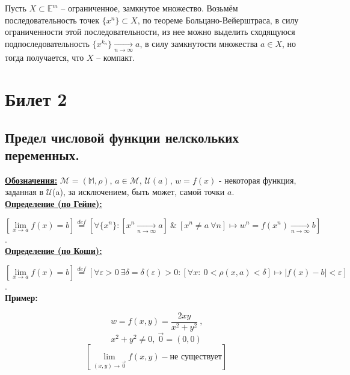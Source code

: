 \documentclass[a4paper,12pt]{article} %
\begin{document}
Пусть $X \subset \mathbb{E}^m$ -- ограниченное, замкнутое множество. Возьмём последовательность точек $\{x^n \} \subset X$, по теореме Больцано-Вейерштраса, в силу ограниченности этой последовательности, из нее можно выделить сходящуюся подпоследовательность $\{x^{k_n} \} \xrightarrow[n \to \infty]{} a$, в силу замкнутости множества $a \in X$, но тогда получается, что $X$ -- компакт.




\newpage
\section{Билет 2}

\subsection{Предел числовой функции нелскольких переменных.}

\underline{\textbf{Обозначения:}}
$\mathscr{M} = (\mathbb{M}, \rho)$, $a \in \mathscr{M}$, $\mathscr{U}(a)$,
$w = f(x)$ - некоторая функция, заданная в $\mathscr{U}$(a), за исключением, быть может, самой точки $a$.\\

\underline{\textbf{Определение (по Гейне):}}

	$[\lim\limits_{x \to a}f(x) = b] \stackrel{def}{=} \left[ \forall \{x^n\}: 
	[x^n \xrightarrow[n \rightarrow \infty]{} a] ~ \& ~ [x^n \neq a ~ \forall n] \mapsto 
	w^n = f(x^n) \xrightarrow[n \rightarrow \infty]{} b\right]$. \\
	
\underline{\textbf{Определение (по Коши):}}

	$[\lim\limits_{x \to a}f(x) = b] \stackrel{def}{=} \left[\forall \varepsilon > 0 ~ 
	\exists\delta = \delta(\varepsilon) > 0: 
	[\forall x: ~ 0 < \rho (x, a) < \delta] \mapsto |f(x) - b| < \varepsilon\right]$. \\

\textbf{Пример:}
	
	$$w = f(x, y) = \frac{2xy}{x^2 + y^2} ~ \text{,}$$
	$$x^2 + y^2 \neq 0, ~ \vec{0} = (0, 0)$$
	$$[\lim\limits_{(x,y) \to \vec{0}}f(x, y) - \text{не существует}]$$
\end{document}
